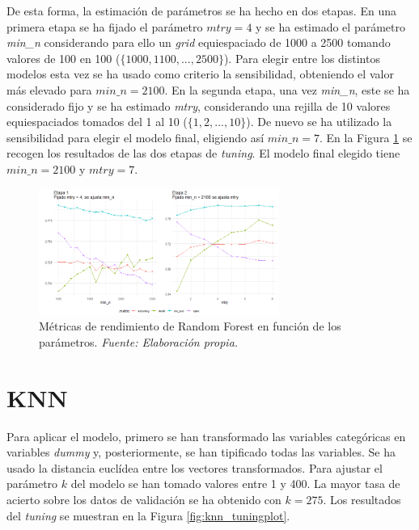 \documentclass[12pt,a4paper,]{book}
\newcounter{dummy}
\numberwithin{dummy}{section}
\theoremstyle{ocrenumbox}
\theoremstyle{blacknumex}
\theoremstyle{blacknumbox}
\theoremstyle{ocrenum}
\theoremstyle{ocrenum}
\begin{document}
De esta forma, la estimación de parámetros se ha hecho en dos etapas. En
una primera etapa se ha fijado el parámetro \(mtry = 4\) y se ha
estimado el parámetro \emph{min\_n} considerando para ello un
\emph{grid} equiespaciado de 1000 a 2500 tomando valores de 100 en 100
(\(\{1000,1100,...,2500\}\)). Para elegir entre los distintos modelos
esta vez se ha usado como criterio la sensibilidad, obteniendo el valor
más elevado para \(min\_n = 2100\). En la segunda etapa, una vez
\emph{min\_n}, este se ha considerado fijo y se ha estimado \emph{mtry},
considerando una rejilla de 10 valores equiespaciados tomados del 1 al
10 (\(\{1,2,...,10\}\)). De nuevo se ha utilizado la sensibilidad para
elegir el modelo final, eligiendo así \(min\_n = 7\). En la Figura
\ref{fig:rf_tuningplot} se recogen los resultados de las dos etapas de
\emph{tuning}. El modelo final elegido tiene \(min\_n = 2100\) y
\(mtry = 7\).

\begin{figure}[h!]
\centering
\includegraphics[width =0.7\textwidth]{graficos/rf_tuningplot.png}
\caption[Métricas de rendimiento de Random Forest en función de los parámetros]{Métricas de rendimiento de Random Forest en función de los parámetros.  \it Fuente: Elaboración propia.}
\label{fig:rf_tuningplot}
\end{figure}

\hypertarget{knn}{%
\section{KNN}\label{knn}}

Para aplicar el modelo, primero se han transformado las variables
categóricas en variables \emph{dummy} y, posteriormente, se han
tipificado todas las variables. Se ha usado la distancia euclídea entre
los vectores transformados. Para ajustar el parámetro \(k\) del modelo
se han tomado valores entre 1 y 400. La mayor tasa de acierto sobre los
datos de validación se ha obtenido con \(k = 275\). Los resultados del
\emph{tuning} se muestran en la Figura \ref{fig:knn_tuningplot}.
\end{document}
